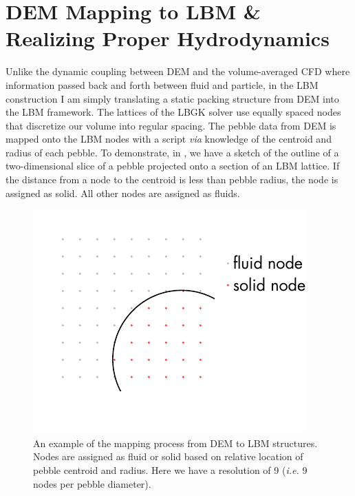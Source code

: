 \section{DEM Mapping to LBM \& Realizing Proper Hydrodynamics}
Unlike the dynamic coupling between DEM and the volume-averaged CFD where information passed back and forth between fluid and particle, in the LBM construction I am simply translating a static packing structure from DEM into the LBM framework. The lattices of the LBGK solver use equally spaced nodes that discretize our volume into regular spacing. The pebble data from DEM is mapped onto the LBM nodes with a script \textit{via} knowledge of the centroid and radius of each pebble. To demonstrate, in , we have a sketch of the outline of a two-dimensional slice of a pebble projected onto a section of an LBM lattice. If the distance from a node to the centroid is less than pebble radius, the node is assigned as solid. All other nodes are assigned as fluids.

\begin{figure}[ht]
	\centering
	\includegraphics[width=\singleimagewidth]{figures/lbm/dem-to-lbm-mapping.pdf}
	\caption{An example of the mapping process from DEM to LBM structures. Nodes are assigned as fluid or solid based on relative location of pebble centroid and radius. Here we have a resolution of 9 (\textit{i.e.} 9 nodes per pebble diameter).}\label{fig:dem-2-lbm-example1}
\end{figure}

